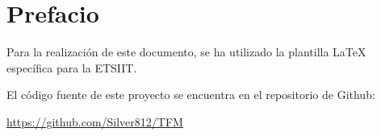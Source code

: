 \chapter*{Prefacio}

Para la realización de este documento, se ha utilizado la plantilla \LaTeX \cite{guervos_jjplantilla-tfg-etsiit_2024} específica para la ETSIIT.

\vspace{20pt}

El código fuente de este proyecto se encuentra en el repositorio de Github:

\begin{center}
\url{https://github.com/Silver812/TFM}
\end{center}